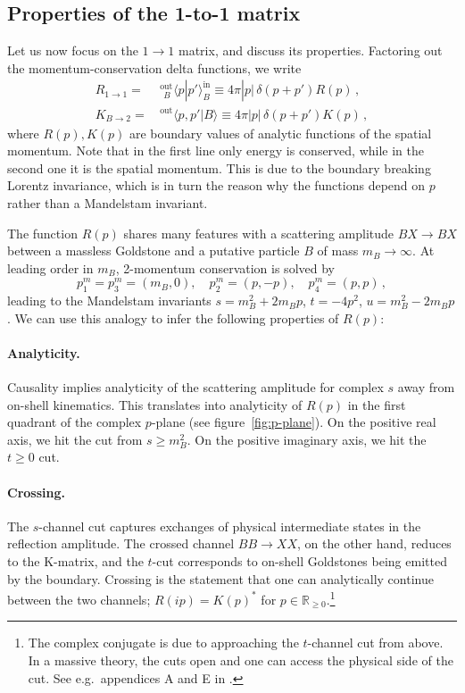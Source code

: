 \documentclass[
 reprint,
 amsmath,
 pre,
 amssymb,
 nofootinbib,
 aps,
 longbibliography,
]{revtex4-1}
\newcommand{\<}{{\langle}}
\renewcommand{\>}{{\rangle}}
\begin{document}
\subsection{Properties of the 1-to-1 matrix}\label{app:R1-1}
Let us now focus on the $1\to 1$ matrix, and discuss its properties. Factoring out the momentum-conservation delta functions, we write
\begin{subequations}
\begin{align}\label{eq:R1-1}
    R_{1\to 1} = &\,{}_{\hspace{5pt}B}^{\text{out}}\langle p | p'\rangle^{\text{in}}_B  \equiv 4\pi |p|\,  \delta(p+p') R(p)\,, \\ \label{eq:KB-2}
    K_{B\to 2} = &\,{}^{\text{out}}\langle p,p' | B\rangle  \equiv 4\pi |p|\,  \delta(p+p') K(p)\,,
\end{align}
\end{subequations}
where $R(p), K(p)$ are boundary values of analytic functions of the spatial momentum. Note that in the first line only energy is conserved, while in the second one it is the spatial momentum. This is due to the boundary breaking Lorentz invariance, which is in turn the reason why the functions depend on $p$ rather than a Mandelstam invariant.

The function $R(p)$ shares many features with a scattering amplitude $B X\to B X$ between a massless Goldstone and a putative particle $B$ of mass $m_B\to \infty$. At leading order in $m_B$, 2-momentum conservation is solved by
\begin{equation}
    p_1^ m = p_3^ m = (m_B,0), \quad p_2^ m = (p,-p), \quad p_4^ m = (p,p)\,,
\end{equation}
leading to the Mandelstam invariants $s=m_B^2 + 2m_B p$, $t=-4p^2$, $u=m_B^2-2m_B p$. We can use this analogy to infer the following properties of $R(p)$:

\paragraph{Analyticity.} Causality implies analyticity of the scattering amplitude for complex $s$ away from on-shell kinematics. This translates into analyticity of $R(p)$ in the first quadrant of the complex $p$-plane (see figure~\ref{fig:p-plane}). On the positive real axis, we hit the cut from $s\geq m_B^2$. On the positive imaginary axis, we hit the $t\geq 0$ cut.

\paragraph{Crossing.} The $s$-channel cut captures exchanges of physical intermediate states in the reflection amplitude. The crossed channel $BB\to XX$, on the other hand, reduces to the K-matrix, and the $t$-cut corresponds to on-shell Goldstones being emitted by the boundary. Crossing is the statement that one can analytically continue between the two channels; $R(ip)=K(p)^*$ for $p\in \mathbb R_{\geq 0}$.\footnote{The complex conjugate is due to approaching the $t$-channel cut from above. In a massive theory, the cuts open and one can access the physical side of the cut. See e.g.\ appendices A and E in \cite{Homrich:2019cbt}.}
\end{document}
